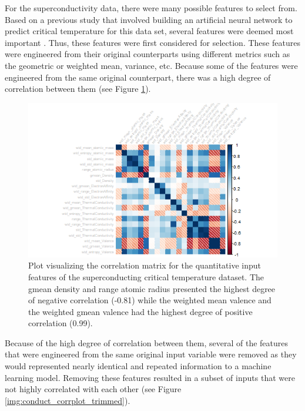 \documentclass[10pt]{article}\usepackage[]{graphicx}\usepackage[]{xcolor}
\begin{document}
\newpage

For the superconductivity data, there were many possible features to select from. Based on a previous study that involved building an artificial neural network to predict critical temperature for this data set, several features were deemed most important \cite{RelatedWork:Conduct}. Thus, these features were first considered for selection. These features were engineered from their original counterparts using different metrics such as the geometric or weighted mean, variance, etc. Because some of the features were engineered from the same original counterpart, there was a high degree of correlation between them (see Figure \ref{img:conduct_corrplot}). \\

\begin{figure}[htp]
  \centering
  \includegraphics[scale=0.8]{EDA/corrplot_conduct.png}
  \caption{Plot visualizing the correlation matrix for the quantitative input features of the superconducting critical temperature dataset. The gmean density and range atomic radius presented the highest degree of negative correlation (-0.81) while the weighted mean valence and the weighted gmean valence had the highest degree of positive correlation (0.99).}
  \label{img:conduct_corrplot}
\end{figure}

Because of the high degree of correlation between them, several of the features that were engineered from the same original input variable were removed as they would represented nearly identical and repeated information to a machine learning model. Removing these features resulted in a subset of inputs that were not highly correlated with each other (see Figure \ref{img:conduct_corrplot_trimmed}). \\
\end{document}
